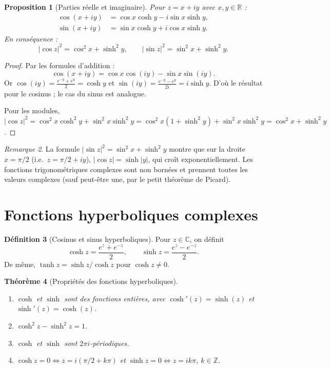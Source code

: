 \documentclass[12pt,a4paper,openany]{book}
\theoremstyle{definition}
\newtheorem{definition}{Définition}[chapter]
\theoremstyle{plain}
\newtheorem{theoreme}[definition]{Théorème}
\newtheorem{proposition}[definition]{Proposition}
\theoremstyle{remark}
\newtheorem{remarque}[definition]{Remarque}
\newcommand{\C}{\mathbb{C}}
\newcommand{\R}{\mathbb{R}}
\newcommand{\Z}{\mathbb{Z}}
\newcommand{\abs}[1]{\left|#1\right|}
\begin{document}
\begin{proposition}[Parties réelle et imaginaire]\label{prop:trig-re-im}
Pour $z = x + iy$ avec $x, y \in \R$ :
\begin{align}
  \cos(x+iy) &= \cos x \cosh y - i \sin x \sinh y, \label{eq:cos-re-im} \\
  \sin(x+iy) &= \sin x \cosh y + i \cos x \sinh y. \label{eq:sin-re-im}
\end{align}
En conséquence :
\[
  \abs{\cos z}^2 = \cos^2 x + \sinh^2 y, \qquad
  \abs{\sin z}^2 = \sin^2 x + \sinh^2 y.
\]
\end{proposition}

\begin{proof}
Par les formules d'addition :
\[
  \cos(x+iy) = \cos x \cos(iy) - \sin x \sin(iy).
\]
Or $\cos(iy) = \frac{e^{-y}+e^y}{2} = \cosh y$ et $\sin(iy) = \frac{e^{-y}-e^y}{2i} = i\sinh y$. D'où le résultat pour le cosinus ; le cas du sinus est analogue.

Pour les modules, $\abs{\cos z}^2 = \cos^2 x \cosh^2 y + \sin^2 x \sinh^2 y = \cos^2 x(1+\sinh^2 y) + \sin^2 x \sinh^2 y = \cos^2 x + \sinh^2 y$.
\end{proof}

\begin{remarque}\label{rem:trig-non-bornee}
La formule $\abs{\sin z}^2 = \sin^2 x + \sinh^2 y$ montre que sur la droite $x = \pi/2$ (i.e.\ $z = \pi/2 + iy$), $\abs{\cos z} = \sinh\abs{y}$, qui croît exponentiellement. Les fonctions trigonométriques complexes sont non bornées et prennent toutes les valeurs complexes (sauf peut-être une, par le petit théorème de Picard).
\end{remarque}

\section{Fonctions hyperboliques complexes}\label{sec:hyp}

\begin{definition}[Cosinus et sinus hyperboliques]\label{def:cosh-sinh}
Pour $z \in \C$, on définit
\[
  \cosh z = \frac{e^z + e^{-z}}{2}, \qquad
  \sinh z = \frac{e^z - e^{-z}}{2}.
\]
De même, $\tanh z = \sinh z / \cosh z$ pour $\cosh z \neq 0$.
\end{definition}

\begin{theoreme}[Propriétés des fonctions hyperboliques]\label{thm:proprietes-hyp}
\leavevmode
\begin{enumerate}[label=(\roman*)]
  \item $\cosh$ et $\sinh$ sont des fonctions entières, avec $\cosh'(z) = \sinh(z)$ et $\sinh'(z) = \cosh(z)$.
  \item $\cosh^2 z - \sinh^2 z = 1$.
  \item $\cosh$ et $\sinh$ sont $2\pi i$-périodiques.
  \item $\cosh z = 0 \iff z = i(\pi/2 + k\pi)$ et $\sinh z = 0 \iff z = ik\pi$, $k \in \Z$.
\end{enumerate}
\end{theoreme}
\end{document}
